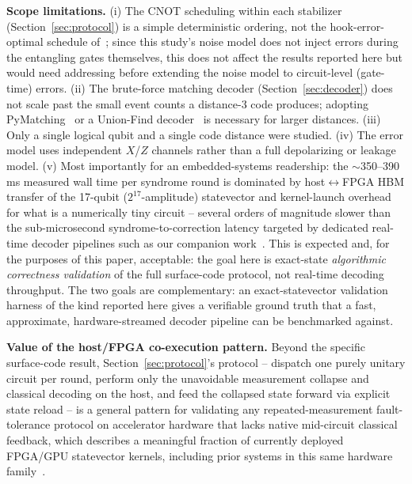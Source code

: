 \documentclass[pdflatex,sn-mathphys,Numbered]{sn-jnl}
\begin{document}
\textbf{Scope limitations.} (i) The CNOT scheduling within each stabilizer (Section~\ref{sec:protocol}) is a simple deterministic ordering, not the hook-error-optimal schedule of~\cite{tomita2014}; since this study's noise model does not inject errors during the entangling gates themselves, this does not affect the results reported here but would need addressing before extending the noise model to circuit-level (gate-time) errors. (ii) The brute-force matching decoder (Section~\ref{sec:decoder}) does not scale past the small event counts a distance-3 code produces; adopting PyMatching~\cite{higgott2022} or a Union-Find decoder~\cite{delfosse2021} is necessary for larger distances. (iii) Only a single logical qubit and a single code distance were studied. (iv) The error model uses independent $X$/$Z$ channels rather than a full depolarizing or leakage model. (v) Most importantly for an embedded-systems readership: the $\sim$350--390\,ms measured wall time per syndrome round is dominated by host$\leftrightarrow$FPGA HBM transfer of the 17-qubit ($2^{17}$-amplitude) statevector and kernel-launch overhead for what is a numerically tiny circuit -- several orders of magnitude slower than the sub-microsecond syndrome-to-correction latency targeted by dedicated real-time decoder pipelines such as our companion work~\cite{ali_shor_steane_qec}. This is expected and, for the purposes of this paper, acceptable: the goal here is exact-state \emph{algorithmic correctness validation} of the full surface-code protocol, not real-time decoding throughput. The two goals are complementary: an exact-statevector validation harness of the kind reported here gives a verifiable ground truth that a fast, approximate, hardware-streamed decoder pipeline can be benchmarked against.

\textbf{Value of the host/FPGA co-execution pattern.} Beyond the specific surface-code result, Section~\ref{sec:protocol}'s protocol -- dispatch one purely unitary circuit per round, perform only the unavoidable measurement collapse and classical decoding on the host, and feed the collapsed state forward via explicit state reload -- is a general pattern for validating any repeated-measurement fault-tolerance protocol on accelerator hardware that lacks native mid-circuit classical feedback, which describes a meaningful fraction of currently deployed FPGA/GPU statevector kernels, including prior systems in this same hardware family~\cite{ali_rtl_statevector,ali_30qubit_sim}.

\end{document}
